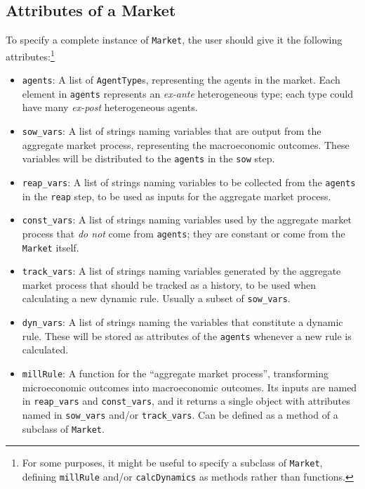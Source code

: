 \documentclass[12pt,titlepage,letterpaper]{econtex}
\begin{document}
\subsection{Attributes of a Market}\label{sec:AttributesOfAMarket}

To specify a complete instance of \texttt{Market}, the user should give it the following attributes:\footnote{For some purposes, it might be useful to specify a subclass of \texttt{Market}, defining \texttt{millRule} and/or \texttt{calcDynamics} as methods rather than functions.}
\begin{itemize}
\item \texttt{agents}: A list of \texttt{AgentType}s, representing the agents in the market.  Each element in \texttt{agents} represents an \textit{ex-ante} heterogeneous type; each type could have many \textit{ex-post} heterogeneous agents.

\item \texttt{sow\_vars}: A list of strings naming variables that are output from the aggregate market process, representing the macroeconomic outcomes.  These variables will be distributed to the \texttt{agents} in the \texttt{sow} step.

\item \texttt{reap\_vars}: A list of strings naming variables to be collected from the \texttt{agents} in the \texttt{reap} step, to be used as inputs for the aggregate market process.

\item \texttt{const\_vars}: A list of strings naming variables used by the aggregate market process that \textit{do not} come from \texttt{agents}; they are constant or come from the \texttt{Market} itself.

\item \texttt{track\_vars}: A list of strings naming variables generated by the aggregate market process that should be tracked as a history, to be used when calculating a new dynamic rule.  Usually a subset of \texttt{sow\_vars}.

\item \texttt{dyn\_vars}: A list of strings naming the variables that constitute a dynamic rule.  These will be stored as attributes of the \texttt{agents} whenever a new rule is calculated.

\item \texttt{millRule}: A function for the ``aggregate market process'', transforming microeconomic outcomes into macroeconomic outcomes.  Its inputs are named in \texttt{reap\_vars} and \texttt{const\_vars}, and it returns a single object with attributes named in \texttt{sow\_vars} and/or \texttt{track\_vars}.  Can be defined as a method of a subclass of \texttt{Market}.


\end{itemize}
\end{document}
